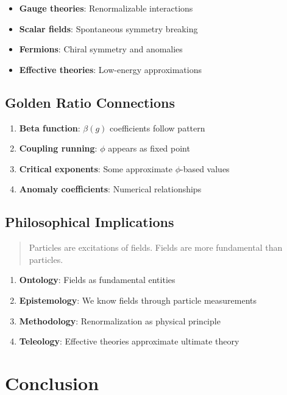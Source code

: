 \begin{itemize}
\item \textbf{Gauge theories}: Renormalizable interactions
\item \textbf{Scalar fields}: Spontaneous symmetry breaking
\item \textbf{Fermions}: Chiral symmetry and anomalies
\item \textbf{Effective theories}: Low-energy approximations
\end{itemize}

\subsection{Golden Ratio Connections}

\begin{enumerate}
\item \textbf{Beta function}: $\beta(g)$ coefficients follow pattern
\item \textbf{Coupling running}: $\phi$ appears as fixed point
\item \textbf{Critical exponents}: Some approximate $\phi$-based values
\item \textbf{Anomaly coefficients}: Numerical relationships
\end{enumerate}

\subsection{Philosophical Implications}

\begin{quote}
Particles are excitations of fields. Fields are more fundamental than particles.
\end{quote}

\begin{enumerate}
\item \textbf{Ontology}: Fields as fundamental entities
\item \textbf{Epistemology}: We know fields through particle measurements
\item \textbf{Methodology}: Renormalization as physical principle
\item \textbf{Teleology}: Effective theories approximate ultimate theory
\end{enumerate}

\section{Conclusion}

